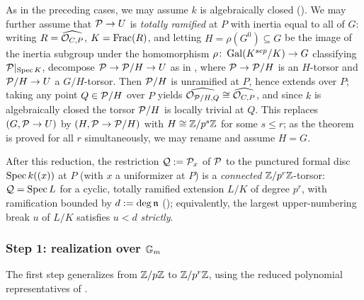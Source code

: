As in the preceding cases, we may assume $k$ is
algebraically closed (). We may further assume that $\mathcal{P} \to U$ is \emph{totally
ramified} at $P$ with inertia equal to all of $G$: writing
$R = \widehat{\mathcal{O}_{C,P}}$, $K = \operatorname{Frac}(R)$, and letting
$H = \rho(G^0) \subseteq G$ be the image of the inertia subgroup under the
homomorphism $\rho \colon \operatorname{Gal}(K^{sep}/K) \to G$ classifying $\mathcal{P}|_{\operatorname{Spec} K}$,
decompose $\mathcal{P} \to \mathcal{P}/H \to U$ as in , where
$\mathcal{P} \to \mathcal{P}/H$ is an $H$-torsor and $\mathcal{P}/H \to U$ a $G/H$-torsor. Then
$\mathcal{P}/H$ is unramified at $P$, hence extends over $P$; taking any point
$Q \in \mathcal{P}/H$ over $P$ yields $\widehat{\mathcal{O}_{\mathcal{P}/H, Q}} \cong \widehat{\mathcal{O}_{C,P}}$,
and since $k$ is algebraically closed the torsor $\mathcal{P}/H$ is locally trivial at
$Q$. This replaces $(G, \mathcal{P} \to U)$ by $(H, \mathcal{P} \to \mathcal{P}/H)$ with
$H \cong \mathbb{Z}/p^s\mathbb{Z}$ for some $s \leq r$; as the theorem is proved for all $r$
simultaneously, we may rename and assume $H = G$.

After this reduction, the restriction $\mathcal{Q} := \mathcal{P}_x$ of $\mathcal{P}$ to the punctured formal
disc $\operatorname{Spec} k((x))$ at $P$ (with $x$ a uniformizer at $P$) is a \emph{connected}
$\mathbb{Z}/p^r\mathbb{Z}$-torsor: $\mathcal{Q} = \operatorname{Spec} L$ for a cyclic, totally ramified extension $L/K$ of
degree $p^r$, with ramification bounded by $d := \deg \mathfrak{n}$
(); equivalently, the largest
upper-numbering break $u$ of $L/K$ satisfies $u < d$ \emph{strictly}.

\subsubsection*{Step 1: realization over $\mathbb{G}_m$}

The first step generalizes  from $\mathbb{Z}/p\mathbb{Z}$ to
$\mathbb{Z}/p^r\mathbb{Z}$, using the reduced polynomial representatives of
.

